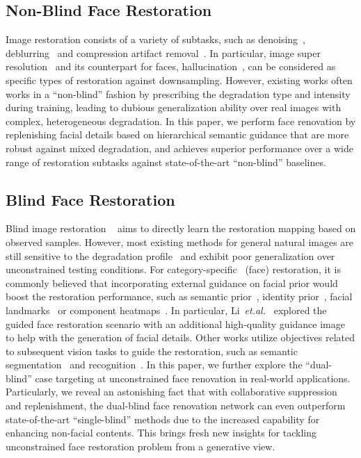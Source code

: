 \documentclass[sigconf]{acmart}
\begin{document}
\subsection{Non-Blind Face Restoration}
Image restoration consists of a variety of subtasks, such as denoising~\cite{RIDNet}\cite{VDNet}, deblurring~\cite{DeblurGAN}\cite{DeblurGANv2} and compression artifact removal~\cite{ARCNN}\cite{EPGAN}.
In particular, image super resolution~\cite{srcnn}\cite{edsr}\cite{srgan}\cite{esrgan} and its counterpart for faces, hallucination~\cite{fh_review}\cite{face_hallu_1}\cite{face_hallu_3}\cite{face_hallu_4}, can be considered as specific types of restoration against downsampling.
However, existing works often works in a ``non-blind'' fashion by prescribing the degradation type and intensity during training, leading to dubious generalization ability over real images with complex, heterogeneous degradation. In this paper, we perform face renovation by replenishing facial details based on hierarchical semantic guidance that are more robust against mixed degradation, and achieves superior performance over a wide range of restoration subtasks against state-of-the-art ``non-blind'' baselines.

\subsection{Blind Face Restoration}
Blind image restoration ~\cite{BIR_original} \cite{BIR_1}\cite{BIR_2} aims to directly learn the restoration mapping based on observed samples. However, most existing methods for general natural images are still sensitive to the degradation profile~\cite{BlindIR-wo-prior} and exhibit poor generalization over unconstrained testing conditions.
For category-specific~\cite{CategorySpecificID} (face) restoration, it is commonly believed that incorporating external guidance on facial prior would boost the restoration performance, such as semantic prior~\cite{ComponentSP}, identity prior~\cite{face_hallu_1}, facial landmarks~\cite{SuperFAN}\cite{FSRNet} or component heatmaps~\cite{faceSR_ECCV2018}. In particular, Li~\emph{et.al.}~\cite{BlindFR-ECCV2018} explored the guided face restoration scenario with an additional high-quality guidance image to help with the generation of facial details. Other works utilize objectives related to subsequent vision tasks to guide the restoration, such as semantic segmentation~\cite{whenID_meets_high} and recognition~\cite{Joint_BIR_recog}. In this paper, we further explore the ``dual-blind'' case targeting at unconstrained face renovation in real-world applications. Particularly, we reveal an astonishing fact that with collaborative suppression and replenishment, the dual-blind face renovation network can even outperform state-of-the-art ``single-blind'' methods due to the increased capability for enhancing non-facial contents. This brings fresh new insights for tackling unconstrained face restoration problem from a generative view.
\end{document}
